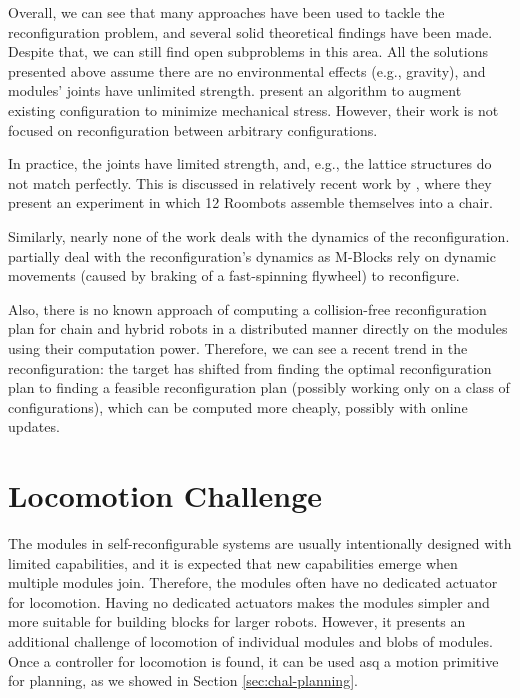 Overall, we can see that many approaches have been used to tackle the
reconfiguration problem, and several solid theoretical findings have been made.
Despite that, we can still find open subproblems in this area. All the solutions
presented above assume there are no environmental effects (e.g., gravity), and
modules' joints have unlimited strength. \textcite{DBLP:journals/jr/SuzukiIKK11}
present an algorithm to augment existing configuration to minimize mechanical
stress. However, their work is not focused on reconfiguration between arbitrary
configurations.

In practice, the joints have limited strength, and, e.g., the lattice structures
do not match perfectly. This is discussed in relatively recent work by
\textcite{DBLP:journals/ras/HauserMLKBI20}, where they present an experiment in
which 12 Roombots assemble themselves into a chair.

Similarly, nearly none of the work deals with the dynamics of the
reconfiguration. \textcite{DBLP:conf/iros/RomanishinMR19} partially deal with
the reconfiguration's dynamics as M-Blocks rely on dynamic movements
(caused by braking of a fast-spinning flywheel) to reconfigure.

Also, there is no known approach of computing a collision-free reconfiguration
plan for chain and hybrid robots in a distributed manner directly on the modules
using their computation power. Therefore, we can see a recent trend in the
reconfiguration: the target has shifted from finding the optimal reconfiguration
plan to finding a feasible reconfiguration plan (possibly working only on a
class of configurations), which can be computed more cheaply, possibly with
online updates.

\section{Locomotion Challenge}\label{sec:chal-locomotion}

The modules in self-reconfigurable systems are usually intentionally designed
with limited capabilities, and it is expected that new capabilities emerge when
multiple modules join. Therefore, the modules often have no dedicated actuator
for locomotion. Having no dedicated actuators makes the modules simpler and more
suitable for building blocks for larger robots. However, it presents an
additional challenge of locomotion of individual modules and blobs of modules.
Once a controller for locomotion is found, it can be used asq a motion primitive
for planning, as we showed in Section \ref{sec:chal-planning}.

